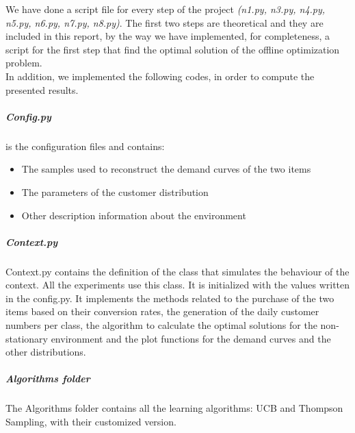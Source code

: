 We have done a script file for every step of the project \textit{(n1.py, n3.py, n4.py, n5.py, n6.py, n7.py, n8.py)}. The first two steps are theoretical and they are included in this report, by the way we have implemented, for completeness, a script for the first step that find the optimal solution of the offline optimization problem.\\
In addition, we implemented the following codes, in order to compute the presented results. 
\subparagraph*{Config.py} is the configuration files and contains:
\begin{itemize}
	\item The samples used to reconstruct the demand curves of the two items
	\item The parameters of the customer distribution
	\item Other description information about the environment
\end{itemize} 

\subparagraph*{Context.py}
Context.py contains the definition of the class that simulates the behaviour of the context. All the experiments use this class. It is initialized with the values written in the config.py. It implements the methods related to the purchase of the two items based on their conversion rates, the generation of the daily customer numbers per class, the algorithm to calculate the optimal solutions for the non-stationary environment and the plot functions for the demand curves and the other distributions.


\subparagraph*{Algorithms folder}
The Algorithms folder contains all the learning algorithms: UCB and Thompson Sampling, with their customized version.